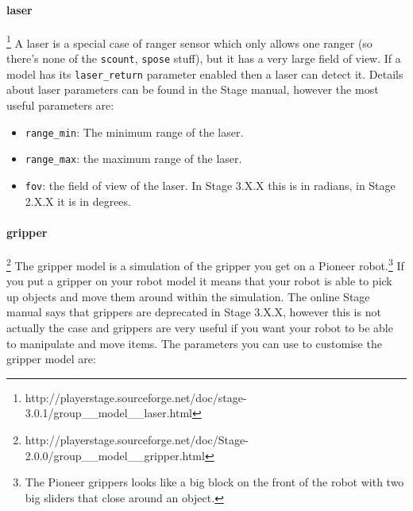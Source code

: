 \documentclass[a4paper]{article}
\begin{document}
\paragraph{laser}\footnote{http://playerstage.sourceforge.net/doc/stage-3.0.1/group\_\_model\_\_laser.html}
A laser is a special case of ranger sensor which only allows one ranger (so there's none of the \verb|scount|, \verb|spose| stuff), but it has a very large field of view. If a model has its \verb|laser_return| parameter enabled then a laser can detect it. Details about laser parameters can be found in the Stage manual, however the most useful parameters are:
\begin{itemize}
\item \verb|range_min|: The minimum range of the laser.
\item \verb|range_max|: the maximum range of the laser.
\item \verb|fov|: the field of view of the laser. In Stage 3.X.X this is in radians, in Stage 2.X.X it is in degrees.
\end{itemize}

\paragraph{gripper}\footnote{http://playerstage.sourceforge.net/doc/Stage-2.0.0/group\_\_model\_\_gripper.html}\label{sec:gripper}
The gripper model is a simulation of the gripper you get on a Pioneer robot.\footnote{The Pioneer grippers looks like a big block on the front of the robot with two big sliders that close around an object.} If you put a gripper on your robot model it means that your robot is able to pick up objects and move them around within the simulation. The online Stage manual says that grippers are deprecated in Stage 3.X.X, however this is not actually the case and grippers are very useful if you want your robot to be able to manipulate and move items. The parameters you can use to customise the gripper model are:
\end{document}

